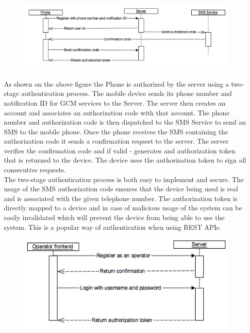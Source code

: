 \documentclass{article}
\begin{document}
\begin{figure}[H]
		\centering
		\includegraphics[width=1\textwidth]{"1"}
	\end{figure}
As shown on the above figure the Phone is authorized by the server using a two-stage authentication process. The mobile device sends its phone number and notification ID for GCM services to the Server. The server then creates an account and associates an authorization code with that account. The phone number and authorization code is then dispatched to the SMS Service to send an SMS to the mobile phone. Once the phone receives the SMS containing the authorization code it sends a confirmation request to the server. The server verifies the confirmation code and if valid - generates and authorization token that is returned to the device. The device uses the authorization token to sign all consecutive requests.\\

The two-stage authentication process is both easy to implement and secure. The usage of the SMS authorization code ensures that the device being used is real and is associated with the given telephone number. The authorization token is directly mapped to a device and in case of malicious usage of the system can be easily invalidated which will prevent the device from being able to use the system. This is a popular way of authentication when using REST APIs.\\

\begin{figure}[H]
		\centering
		\includegraphics[width=1\textwidth]{"2"}
	\end{figure}
\end{document}
